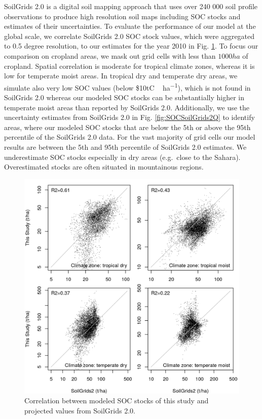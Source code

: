 \documentclass[gc, manuscript]{copernicus}
\begin{document}
SoilGrids 2.0 \citep{poggio_soilgrids_2021} is a digital soil mapping approach that uses over 240 000 soil profile observations to produce high resolution soil maps including SOC stocks and estimates of their uncertainties. To evaluate the performance of our model at the global scale, we correlate SoilGrids 2.0 SOC stock values, which were aggregated to 0.5 degree resolution, to our estimates for the year 2010 in Fig. \ref{fig:SOCSoilGrids2}. To focus our comparison on cropland areas, we mask out grid cells with less than \(1000\unit{ha}\) of cropland. Spatial correlation is moderate for tropical climate zones, whereas it is low for temperate moist areas. In tropical dry and temperate dry areas, we simulate also very low SOC values (below \$10\unit{tC\,ha^{-1}}), which is not found in SoilGrids 2.0 whereas our modeled SOC stocks can be substantially higher in temperate moist areas than reported by SoilGrids 2.0.
Additionally, we use the uncertainty estimates from SoilGrids 2.0 in Fig. \ref{fig:SOCSoilGrids2Q} to identify areas, where our modeled SOC stocks that are below the 5th or above the 95th percentile of the SoilGrids 2.0 data.
For the vast majority of grid cells our model results are between the 5th and 95th percentile of SoilGrids 2.0 estimates. We underestimate SOC stocks especially in dry areas (e.g.~close to the Sahara). Overestimated stocks are often situated in mountainous regions.

\begin{figure}[h]
\includegraphics[width=13cm]{../ResultNotebooks/Output/Images/scatterCompareSoilGrids2_2010_lu} \caption{Correlation between modeled SOC stocks of this study and projected values from SoilGrids 2.0.}\label{fig:SOCSoilGrids2}
\end{figure}
\end{document}
